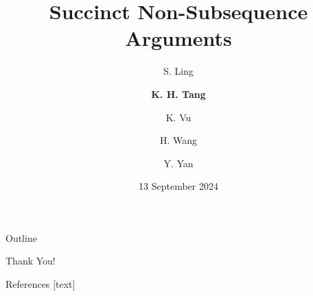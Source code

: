 \documentclass{beamer}
\title{Succinct Non-Subsequence Arguments}
\date{13 September 2024}
\author{ S. Ling\and \textbf{K. H. Tang}\and K. Vu\and H. Wang\and Y. Yan}
\begin{document}
	\begin{frame}
		\titlepage
	\end{frame}
	
	\begin{frame}{Outline}
		\tableofcontents
	\end{frame}
	
	
	
	
	\begin{frame}{}
		\begin{center}
			{\fontsize{20}{20}\selectfont Thank You!}
		\end{center}
	\end{frame}
	
	\begin{frame}[allowframebreaks]{References}
		
		
		
	\end{frame}
\end{document}
